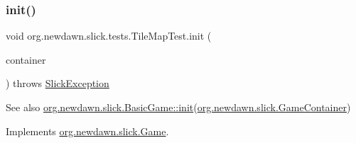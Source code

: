 \subsubsection{\texorpdfstring{init()}{init()}}
{\footnotesize\ttfamily void org.\+newdawn.\+slick.\+tests.\+Tile\+Map\+Test.\+init (\begin{DoxyParamCaption}\item[{\mbox{\hyperlink{classorg_1_1newdawn_1_1slick_1_1_game_container}{Game\+Container}}}]{container }\end{DoxyParamCaption}) throws \mbox{\hyperlink{classorg_1_1newdawn_1_1slick_1_1_slick_exception}{Slick\+Exception}}\hspace{0.3cm}{\ttfamily [inline]}}

\begin{DoxySeeAlso}{See also}
\mbox{\hyperlink{classorg_1_1newdawn_1_1slick_1_1_basic_game_a8af0900217e4d389249f71367b22d114}{org.\+newdawn.\+slick.\+Basic\+Game\+::init}}(\mbox{\hyperlink{classorg_1_1newdawn_1_1slick_1_1_game_container}{org.\+newdawn.\+slick.\+Game\+Container}}) 
\end{DoxySeeAlso}


Implements \mbox{\hyperlink{interfaceorg_1_1newdawn_1_1slick_1_1_game_ad2dd6affab08bb8fdb5fab0815957b7a}{org.\+newdawn.\+slick.\+Game}}.


